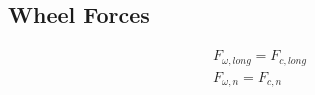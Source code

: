 \documentclass[../SimBALink.tex]{subfiles}
\begin{document}
\subsection{Wheel Forces}

\begin{gather}
F_{\omega,long} = F_{c,long} \\
F_{\omega,n} = F_{c,n}
\end{gather}
\end{document}
